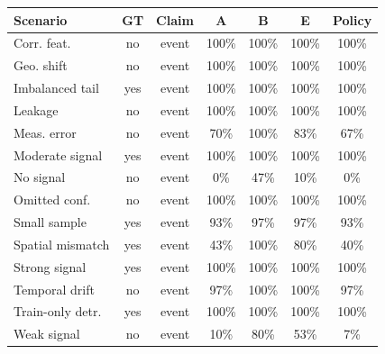 \begin{tabular}{@{}p{}cccccc@{}}
\toprule
Scenario & GT & Claim & A & B & E & Policy \\
\midrule
Corr. feat. & no & event & 100\% & 100\% & 100\% & 100\% \\
Geo. shift & no & event & 100\% & 100\% & 100\% & 100\% \\
Imbalanced tail & yes & event & 100\% & 100\% & 100\% & 100\% \\
Leakage & no & event & 100\% & 100\% & 100\% & 100\% \\
Meas. error & no & event & 70\% & 100\% & 83\% & 67\% \\
Moderate signal & yes & event & 100\% & 100\% & 100\% & 100\% \\
No signal & no & event & 0\% & 47\% & 10\% & 0\% \\
Omitted conf. & no & event & 100\% & 100\% & 100\% & 100\% \\
Small sample & yes & event & 93\% & 97\% & 97\% & 93\% \\
Spatial mismatch & yes & event & 43\% & 100\% & 80\% & 40\% \\
Strong signal & yes & event & 100\% & 100\% & 100\% & 100\% \\
Temporal drift & no & event & 97\% & 100\% & 100\% & 97\% \\
Train-only detr. & yes & event & 100\% & 100\% & 100\% & 100\% \\
Weak signal & no & event & 10\% & 80\% & 53\% & 7\% \\
\bottomrule
\end{tabular}
